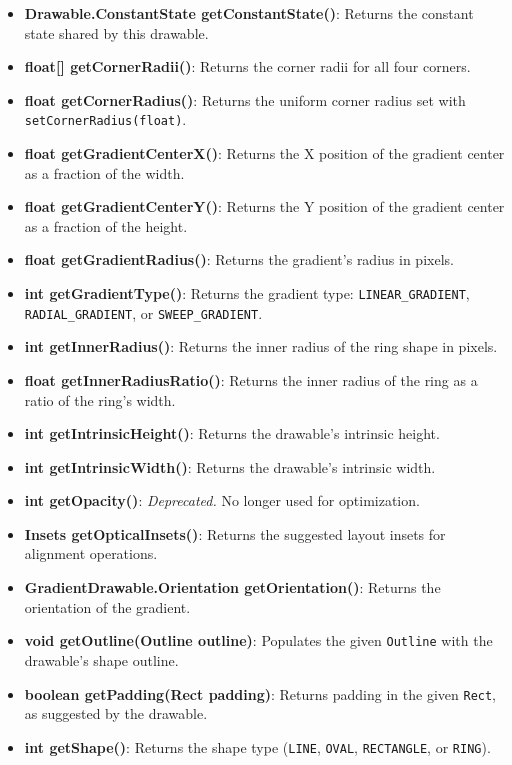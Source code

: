 \documentclass{report}
\begin{document}
\begin{itemize}
\begin{itemize}
            \item \textbf{Drawable.ConstantState getConstantState()}: Returns the constant state shared by this drawable.
            \item \textbf{float[] getCornerRadii()}: Returns the corner radii for all four corners.
            \item \textbf{float getCornerRadius()}: Returns the uniform corner radius set with \texttt{setCornerRadius(float)}.
            \item \textbf{float getGradientCenterX()}: Returns the X position of the gradient center as a fraction of the width.
            \item \textbf{float getGradientCenterY()}: Returns the Y position of the gradient center as a fraction of the height.
            \item \textbf{float getGradientRadius()}: Returns the gradient’s radius in pixels.
            \item \textbf{int getGradientType()}: Returns the gradient type: \texttt{LINEAR\_GRADIENT}, \texttt{RADIAL\_GRADIENT}, or \texttt{SWEEP\_GRADIENT}.
            \item \textbf{int getInnerRadius()}: Returns the inner radius of the ring shape in pixels.
            \item \textbf{float getInnerRadiusRatio()}: Returns the inner radius of the ring as a ratio of the ring’s width.
            \item \textbf{int getIntrinsicHeight()}: Returns the drawable’s intrinsic height.
            \item \textbf{int getIntrinsicWidth()}: Returns the drawable’s intrinsic width.
            \item \textbf{int getOpacity()}: \textit{Deprecated.} No longer used for optimization.
            \item \textbf{Insets getOpticalInsets()}: Returns the suggested layout insets for alignment operations.
            \item \textbf{GradientDrawable.Orientation getOrientation()}: Returns the orientation of the gradient.
            \item \textbf{void getOutline(Outline outline)}: Populates the given \texttt{Outline} with the drawable’s shape outline.
            \item \textbf{boolean getPadding(Rect padding)}: Returns padding in the given \texttt{Rect}, as suggested by the drawable.
            \item \textbf{int getShape()}: Returns the shape type (\texttt{LINE}, \texttt{OVAL}, \texttt{RECTANGLE}, or \texttt{RING}).

\end{itemize}
\end{itemize}
\end{document}
